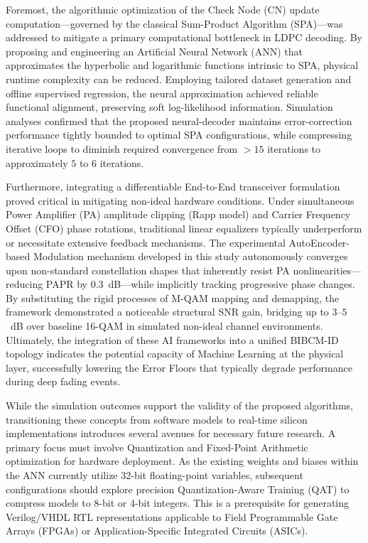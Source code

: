 \documentclass[a4paper,14pt]{extreport}
\begin{document}
Foremost, the algorithmic optimization of the Check Node (CN) update computation---governed by the classical Sum-Product Algorithm (SPA)---was addressed to mitigate a primary computational bottleneck in LDPC decoding. By proposing and engineering an Artificial Neural Network (ANN) that approximates the hyperbolic and logarithmic functions intrinsic to SPA, physical runtime complexity can be reduced. Employing tailored dataset generation and offline supervised regression, the neural approximation achieved reliable functional alignment, preserving soft log-likelihood information. Simulation analyses confirmed that the proposed neural-decoder maintains error-correction performance tightly bounded to optimal SPA configurations, while compressing iterative loops to diminish required convergence from $>15$ iterations to approximately $5$ to $6$ iterations.

Furthermore, integrating a differentiable End-to-End transceiver formulation proved critical in mitigating non-ideal hardware conditions. Under simultaneous Power Amplifier (PA) amplitude clipping (Rapp model) and Carrier Frequency Offset (CFO) phase rotations, traditional linear equalizers typically underperform or necessitate extensive feedback mechanisms. The experimental AutoEncoder-based Modulation mechanism developed in this study autonomously converges upon non-standard constellation shapes that inherently resist PA nonlinearities---reducing PAPR by $0.3$~dB---while implicitly tracking progressive phase changes. By substituting the rigid processes of M-QAM mapping and demapping, the framework demonstrated a noticeable structural SNR gain, bridging up to $3$--$5$~dB over baseline 16-QAM in simulated non-ideal channel environments. Ultimately, the integration of these AI frameworks into a unified BIBCM-ID topology indicates the potential capacity of Machine Learning at the physical layer, successfully lowering the Error Floors that typically degrade performance during deep fading events.

While the simulation outcomes support the validity of the proposed algorithms, transitioning these concepts from software models to real-time silicon implementations introduces several avenues for necessary future research. A primary focus must involve Quantization and Fixed-Point Arithmetic optimization for hardware deployment. As the existing weights and biases within the ANN currently utilize 32-bit floating-point variables, subsequent configurations should explore precision Quantization-Aware Training (QAT) to compress models to 8-bit or 4-bit integers. This is a prerequisite for generating Verilog/VHDL RTL representations applicable to Field Programmable Gate Arrays (FPGAs) or Application-Specific Integrated Circuits (ASICs). 
\end{document}
